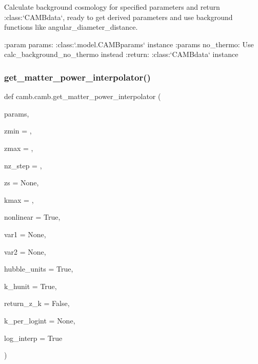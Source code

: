 \begin{DoxyVerb}Calculate background cosmology for specified parameters and return :class:`CAMBdata`, ready to get derived
 parameters and use background functions like angular_diameter_distance.

:param params: :class:`.model.CAMBparams` instance
:params no_thermo: Use calc_background_no_thermo instead
:return: :class:`CAMBdata` instance
\end{DoxyVerb}
 \mbox{\label{namespacecamb_1_1camb_a1418924a33e3086804b351674832636c}} 
\subsubsection{\texorpdfstring{get\+\_\+matter\+\_\+power\+\_\+interpolator()}{get\_matter\_power\_interpolator()}}
{\footnotesize\ttfamily def camb.\+camb.\+get\+\_\+matter\+\_\+power\+\_\+interpolator (\begin{DoxyParamCaption}\item[{}]{params,  }\item[{}]{zmin = {},  }\item[{}]{zmax = {},  }\item[{}]{nz\+\_\+step = {},  }\item[{}]{zs = {\ttfamily None},  }\item[{}]{kmax = {},  }\item[{}]{nonlinear = {\ttfamily True},  }\item[{}]{var1 = {\ttfamily None},  }\item[{}]{var2 = {\ttfamily None},  }\item[{}]{hubble\+\_\+units = {\ttfamily True},  }\item[{}]{k\+\_\+hunit = {\ttfamily True},  }\item[{}]{return\+\_\+z\+\_\+k = {\ttfamily False},  }\item[{}]{k\+\_\+per\+\_\+logint = {\ttfamily None},  }\item[{}]{log\+\_\+interp = {\ttfamily True} }\end{DoxyParamCaption})}

